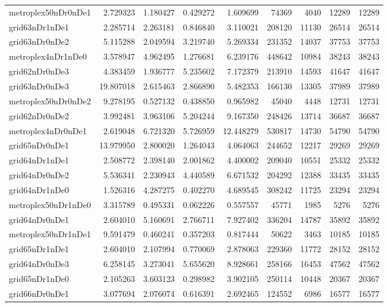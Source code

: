 \begin{longtable}{|l|r|r|r|r|r|r|r|r|}
metroplex50nDr0nDe1 & 2.729323 & 1.180427 & 0.429272 & 1.609699 & 74369 & 4040 & 12289 & 12289 \\
grid63nDr1nDe1 & 2.285714 & 2.263181 & 0.846840 & 3.110021 & 208120 & 11130 & 26514 & 26514 \\
grid63nDr0nDe2 & 5.115288 & 2.049594 & 3.219740 & 5.269334 & 231352 & 14037 & 37753 & 37753 \\
metroplex4nDr1nDe0 & 3.578947 & 4.962495 & 1.276681 & 6.239176 & 448642 & 10984 & 38243 & 38243 \\
grid62nDr0nDe3 & 4.383459 & 1.936777 & 5.235602 & 7.172379 & 213910 & 14593 & 41647 & 41647 \\
grid63nDr0nDe3 & 19.807018 & 2.615463 & 2.866890 & 5.482353 & 166130 & 13305 & 37989 & 37989 \\
metroplex50nDr0nDe2 & 9.278195 & 0.527132 & 0.438850 & 0.965982 & 45040 & 4448 & 12731 & 12731 \\
grid62nDr0nDe2 & 3.992481 & 3.963106 & 5.204244 & 9.167350 & 248426 & 13714 & 36687 & 36687 \\
metroplex4nDr0nDe1 & 2.619048 & 6.721320 & 5.726959 & 12.448279 & 530817 & 14730 & 54790 & 54790 \\
grid65nDr0nDe1 & 13.979950 & 2.800020 & 1.264043 & 4.064063 & 244652 & 12217 & 29269 & 29269 \\
grid64nDr1nDe1 & 2.508772 & 2.398140 & 2.001862 & 4.400002 & 209040 & 10551 & 25332 & 25332 \\
grid64nDr0nDe2 & 5.536341 & 2.230943 & 4.440589 & 6.671532 & 204292 & 12388 & 33435 & 33435 \\
grid64nDr1nDe0 & 1.526316 & 4.287275 & 0.402270 & 4.689545 & 308242 & 11725 & 23294 & 23294 \\
metroplex50nDr1nDe0 & 3.315789 & 0.495331 & 0.062226 & 0.557557 & 45771 & 1985 & 5276 & 5276 \\
grid64nDr0nDe1 & 2.604010 & 5.160691 & 2.766711 & 7.927402 & 336204 & 14787 & 35892 & 35892 \\
metroplex50nDr1nDe1 & 9.591479 & 0.460241 & 0.357203 & 0.817444 & 50622 & 3463 & 10185 & 10185 \\
grid65nDr1nDe1 & 2.604010 & 2.107994 & 0.770069 & 2.878063 & 229360 & 11772 & 28152 & 28152 \\
grid64nDr0nDe3 & 6.258145 & 3.273041 & 5.655620 & 8.928661 & 258166 & 16453 & 47562 & 47562 \\
grid65nDr1nDe0 & 2.105263 & 3.603123 & 0.298982 & 3.902105 & 250114 & 10448 & 20367 & 20367 \\
grid66nDr0nDe1 & 3.077694 & 2.076074 & 0.616391 & 2.692465 & 124552 & 6986 & 16577 & 16577 \\

\end{longtable}
